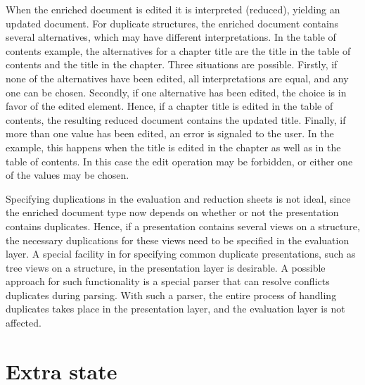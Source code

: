 When the enriched document is edited it is interpreted (reduced), yielding an updated document. For duplicate structures, the enriched document contains several alternatives, which may have different interpretations. In the table of contents example, the alternatives for a chapter title are the title in the table of contents and the title in the chapter. Three situations are possible. Firstly, if none of the alternatives have been edited, all interpretations are equal, and any one can be chosen. Secondly, if one alternative has been edited, the choice is in favor of the edited element. Hence, if a chapter title is edited in the table of contents, the resulting reduced document contains the updated title. Finally, if more than one value has been edited, an error is signaled to the user. In the example, this happens when the title is edited in the chapter as well as in the table of contents. In this case the edit operation may be forbidden, or either one of the values may be chosen.  

Specifying duplications in the evaluation and reduction sheets is not ideal, since the enriched document type now depends on whether or not the presentation contains duplicates. Hence, if a presentation contains several views on a structure, the necessary duplications for these views need to be specified in the evaluation layer. A special facility in for specifying common duplicate presentations, such as tree views on a structure, in the presentation layer is desirable. A possible approach for such functionality is a special parser that can resolve conflicts duplicates during parsing. With such a parser, the entire process of handling duplicates takes place in the presentation layer, and the evaluation layer is not affected. 

%																
%																
%																
\section{Extra state} \label{sect:extraState}



